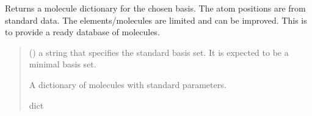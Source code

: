 \documentclass[letterpaper,10pt,english]{sphinxmanual}
\begin{document}
\begin{fulllineitems}
\label{\detokenize{api:MSTOOpt.moldict}}
\pysigstartsignatures
\pysiglinewithargsret
{}
{}
{}
\pysigstopsignatures
\sphinxAtStartPar
Returns a  molecule dictionary for the chosen basis. The atom positions are from standard data. The elements/molecules are limited and can be improved. This is to provide a ready database of molecules.
\begin{quote}\begin{description}
\sphinxAtStartPar
{} () \textendash{} a string that specifies the standard basis set. It is expected to be a minimal basis set.

\sphinxAtStartPar
A dictionary of molecules with standard parameters.

\sphinxAtStartPar
dict

\end{description}\end{quote}


\end{fulllineitems}
\end{document}
